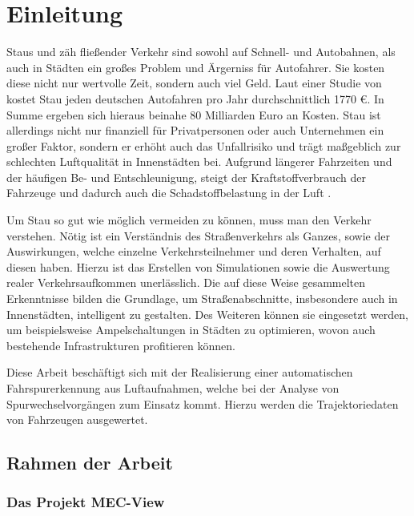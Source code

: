 
\chapter{Einleitung}
\label{cha:introduction}

Staus und zäh fließender Verkehr sind sowohl auf Schnell- und Autobahnen, als auch in Städten ein großes
Problem und Ärgerniss für Autofahrer. Sie kosten diese nicht nur wertvolle Zeit, sondern auch viel Geld.
Laut einer Studie von \cite[]{Cookson} kostet Stau jeden deutschen Autofahren pro Jahr durchschnittlich 1770 €.
In Summe ergeben sich hieraus beinahe 80 Milliarden Euro an Kosten.
Stau ist allerdings nicht nur finanziell für Privatpersonen oder auch Unternehmen ein großer Faktor,
sondern er erhöht auch das Unfallrisiko und trägt maßgeblich zur schlechten Luftqualität in Innenstädten bei.
Aufgrund längerer Fahrzeiten und der häufigen Be- und Entschleunigung, steigt der Kraftstoffverbrauch der
Fahrzeuge und dadurch auch die Schadstoffbelastung in der Luft \cite[]{Hemmerle2016}.

Um Stau so gut wie möglich vermeiden zu können, muss man den Verkehr verstehen. Nötig
ist ein Verständnis des Straßenverkehrs als Ganzes, sowie der Auswirkungen, welche einzelne Verkehrsteilnehmer
und deren Verhalten, auf diesen haben. Hierzu ist das Erstellen von Simulationen sowie die Auswertung
realer Verkehrsaufkommen unerlässlich.
Die auf diese Weise gesammelten Erkenntnisse bilden die Grundlage, um Straßenabschnitte, insbesondere
auch in Innenstädten, intelligent zu gestalten.
Des Weiteren können sie eingesetzt werden, um beispielsweise Ampelschaltungen in Städten zu optimieren,
wovon auch bestehende Infrastrukturen profitieren können.

Diese Arbeit beschäftigt sich mit der Realisierung einer automatischen Fahrspurerkennung aus Luftaufnahmen,
welche bei der Analyse von Spurwechselvorgängen zum Einsatz kommt. Hierzu werden die Trajektoriedaten
von Fahrzeugen ausgewertet.


\section{Rahmen der Arbeit}
\label{sec:rahmen_arbeit}

\subsection{Das Projekt MEC-View}
\label{sec:mec_view}

